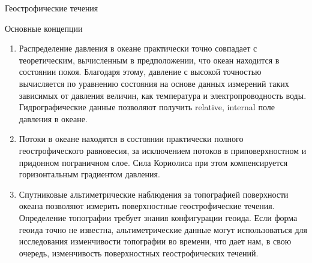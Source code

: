 \begin{chapter}{Геострофические течения}
\begin{section}{Основные концепции}
\begin{enumerate}
\item
Распределение давления в океане практически точно совпадает с теоретическим,
вычисленным в предположении, что океан находится в состоянии покоя. Благодаря
этому, давление с высокой точностью вычисляется по уравнению состояния 
на основе данных измерений таких зависимых от давления величин, как температура 
и электропроводность воды. Гидрографические 
данные позволяют получить 
relative, internal поле давления в океане.
%

\item
Потоки в океане находятся в состоянии практически полного геострофического 
равновесия, за исключением потоков в 
приповерхностном и придонном пограничном слое. Сила Кориолиса при этом
компенсируется горизонтальным градиентом давления.
%

\item
Спутниковые альтиметрические наблюдения за топографией поверхности океана 
позволяют измерить поверхностные геострофические 
течения. Определение
топографии требует знания конфигурации геоида. 
Если форма геоида точно не известна, альтиметрические данные могут 
использоваться для исследования изменчивости топографии во времени,
что дает нам, в свою очередь, изменчивость поверхностных геострофических 
течений.
%


\end{enumerate}
\end{section}
\end{chapter}
